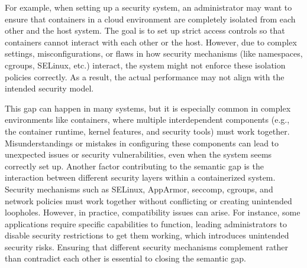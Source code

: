 For example, when setting up a security system, an administrator may want to ensure that containers in a cloud environment are completely isolated from each other and the host system. The goal is to set up strict access controls so that containers cannot interact with each other or the host. However, due to complex settings, misconfigurations, or flaws in how security mechanisms (like namespaces, cgroups, SELinux, etc.) interact, the system might not enforce these isolation policies correctly. As a result, the actual performance may not align with the intended security model.

This gap can happen in many systems, but it is especially common in complex environments like containers, where multiple interdependent components (e.g., the container runtime, kernel features, and security tools) must work together. Misunderstandings or mistakes in configuring these components can lead to unexpected issues or security vulnerabilities, even when the system seems correctly set up. Another factor contributing to the semantic gap is the interaction between different security layers within a containerized system. Security mechanisms such as SELinux, AppArmor, seccomp, cgroups, and network policies must work together without conflicting or creating unintended loopholes. However, in practice, compatibility issues can arise. For instance, some applications require specific capabilities to function, leading administrators to disable security restrictions to get them working, which introduces unintended security risks. Ensuring that different security mechanisms complement rather than contradict each other is essential to closing the semantic gap.


